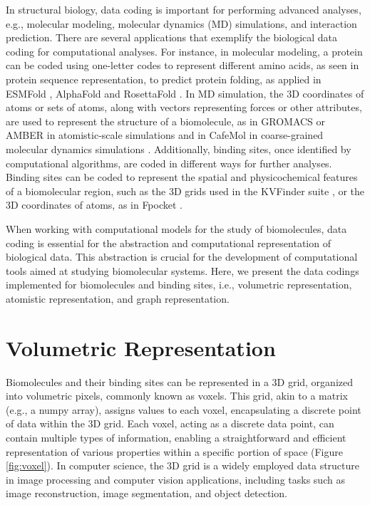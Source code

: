 \documentclass[Ingles]{phdthesis}
\def\ie{i.e.\onedot}
\def\eg{e.g.\onedot}
\begin{document}
In structural biology, data coding is important for performing advanced analyses, \eg, molecular modeling, molecular dynamics (MD) simulations, and interaction prediction. There are several applications that exemplify the biological data coding for computational analyses. For instance, in molecular modeling, a protein can be coded using one-letter codes to represent different amino acids, as seen in protein sequence representation, to predict protein folding, as applied in ESMFold \cite{lin2022}, AlphaFold \cite{jumper2021} and RosettaFold \cite{baek2021}. In MD simulation, the 3D coordinates of atoms or sets of atoms, along with vectors representing forces or other attributes, are used to represent the structure of a biomolecule, as in GROMACS \cite{gromacs} or AMBER \cite{amber} in atomistic-scale simulations and in CafeMol in coarse-grained molecular dynamics simulations \cite{kenzaki2011}. Additionally, binding sites, once identified by computational algorithms, are coded in different ways for further analyses. Binding sites can be coded to represent the spatial and physicochemical features of a biomolecular region, such as the 3D grids used in the KVFinder suite \cite{guerra2019,guerra2020,guerra2021,guerra2023B}, or the 3D coordinates of atoms, as in Fpocket \cite{fpocket}.

When working with computational models for the study of biomolecules, data coding is essential for the abstraction and computational representation of biological data. This abstraction is crucial for the development of computational tools aimed at studying biomolecular systems. Here, we present the data codings implemented for biomolecules and binding sites, \ie, volumetric representation, atomistic representation, and graph representation.

\section{Volumetric Representation}

Biomolecules and their binding sites can be represented in a 3D grid, organized into volumetric pixels, commonly known as voxels. This grid, akin to a matrix (\eg, a numpy array), assigns values to each voxel, encapsulating a discrete point of data within the 3D grid. Each voxel, acting as a discrete data point, can contain multiple types of information, enabling a straightforward and efficient representation of various properties within a specific portion of space (Figure \ref{fig:voxel}). In computer science, the 3D grid is a widely employed data structure in image processing and computer vision applications, including tasks such as image reconstruction, image segmentation, and object detection.
\end{document}
